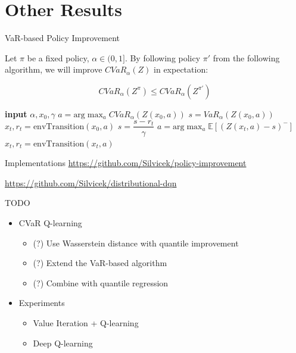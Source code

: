 \documentclass{beamer}
\begin{document}
\section{Other Results}

\begin{frame}{VaR-based Policy Improvement}
\begin{theorem}
Let $\pi$ be a fixed policy, $\alpha \in (0, 1]$. By following policy $\pi'$ from the following algorithm, we will improve $CVaR_\alpha(Z)$ in expectation:

$$CVaR_\alpha(Z^\pi) \le CVaR_\alpha(Z^{\pi'})$$
\end{theorem}


\begin{algorithmic}
    \STATE \textbf{input} $\alpha, x_0, \gamma$
    \STATE $a = \text{arg}\max_a CVaR_\alpha(Z(x_0, a))$
    \STATE $s = VaR_\alpha(Z(x_0, a))$
    \STATE $x_t, r_t = \text{envTransition}(x_0, a)$
    	\STATE $s = \dfrac{s-r_t}{\gamma}$
    	\STATE $a = \text{arg}\max_a \mathbb{E}\left[(Z(x_t, a)-s)^- \right]$
    	\STATE $x_t, r_t = \text{envTransition}(x_t, a)$
   	\ENDWHILE
\end{algorithmic}

\end{frame}


\begin{frame}{Implementations}
\center
\url{https://github.com/Silvicek/policy-improvement}

\vspace{1cm}

\url{https://github.com/Silvicek/distributional-dqn}

\end{frame}

\begin{frame}{TODO}

\begin{itemize}
\item CVaR Q-learning
\begin{itemize}
\item (?) Use Wasserstein distance with quantile improvement
\item (?) Extend the VaR-based algorithm
\item (?) Combine with quantile regression
\end{itemize}

\item Experiments
\begin{itemize}
\item Value Iteration + Q-learning
\item Deep Q-learning
\end{itemize}



\end{itemize}



\end{frame}
\end{document}
